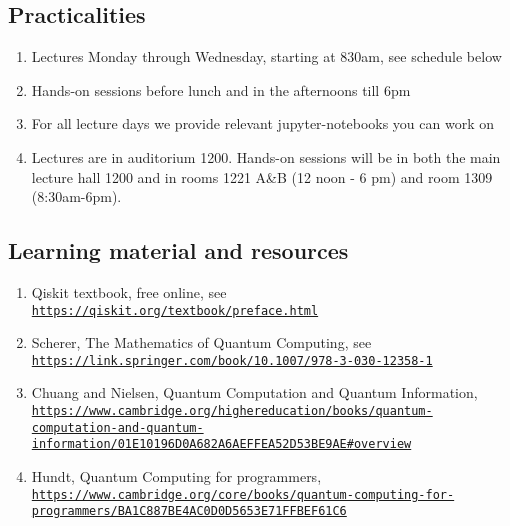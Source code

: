 \documentclass[%
oneside,                 %
final,                   %
10pt]{article}
\begin{document}
\subsection{Practicalities}

\begin{enumerate}
\item Lectures Monday through Wednesday, starting at 830am, see schedule below

\item Hands-on sessions before lunch and in the afternoons till 6pm

\item For all lecture days we provide relevant jupyter-notebooks you can work on

\item Lectures are in auditorium 1200. Hands-on sessions will be in both the main lecture hall 1200 and in rooms 1221 A{\&}B (12 noon - 6 pm) and room 1309 (8:30am-6pm).
\end{enumerate}

\noindent
\subsection{Learning material and resources}
\begin{enumerate}
\item Qiskit textbook, free online, see \href{{https://qiskit.org/textbook/preface.html}}{\nolinkurl{https://qiskit.org/textbook/preface.html}}

\item Scherer, The Mathematics of Quantum Computing, see \href{{https://link.springer.com/book/10.1007/978-3-030-12358-1}}{\nolinkurl{https://link.springer.com/book/10.1007/978-3-030-12358-1}}

\item Chuang and Nielsen, Quantum Computation and Quantum Information, \href{{https://www.cambridge.org/highereducation/books/quantum-computation-and-quantum-information/01E10196D0A682A6AEFFEA52D53BE9AE#overview}}{\nolinkurl{https://www.cambridge.org/highereducation/books/quantum-computation-and-quantum-information/01E10196D0A682A6AEFFEA52D53BE9AE\#overview}}

\item Hundt, Quantum Computing for programmers, \href{{https://www.cambridge.org/core/books/quantum-computing-for-programmers/BA1C887BE4AC0D0D5653E71FFBEF61C6}}{\nolinkurl{https://www.cambridge.org/core/books/quantum-computing-for-programmers/BA1C887BE4AC0D0D5653E71FFBEF61C6}}
\end{enumerate}
\end{document}
